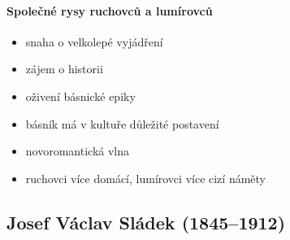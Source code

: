 \paragraph{Společné rysy ruchovců a lumírovců}
\begin{itemize}
\item snaha o velkolepé vyjádření 
\item zájem o historii
\item oživení básnické epiky
\item básník má v kultuře důležité postavení
\item novoromantická vlna
\item ruchovci více domácí, lumírovci více cizí náměty
\end{itemize}

\subsection{Josef Václav Sládek (1845--1912)}
